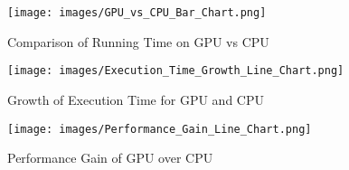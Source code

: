 \begin{figure}[ht]
    \centering
    \texttt{[image: images/GPU\_vs\_CPU\_Bar\_Chart.png]}
    \caption{Comparison of Running Time on GPU vs CPU}
    \label{fig:gpu_vs_cpu}
\end{figure}

\begin{figure}[ht]
    \centering
    \texttt{[image: images/Execution\_Time\_Growth\_Line\_Chart.png]}
    \caption{Growth of Execution Time for GPU and CPU}
    \label{fig:execution_time_growth}
\end{figure}

\begin{figure}[ht]
    \centering
    \texttt{[image: images/Performance\_Gain\_Line\_Chart.png]}
    \caption{Performance Gain of GPU over CPU}
    \label{fig:performance_gain}
\end{figure}
